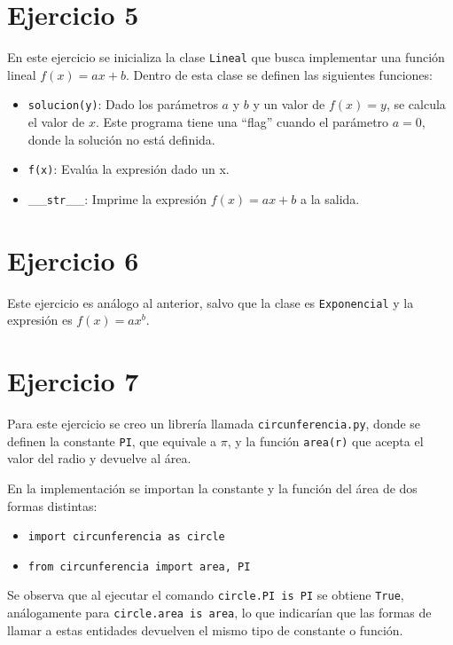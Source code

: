 \section*{Ejercicio 5}

En este ejercicio se inicializa la clase \verb|Lineal| que busca implementar una función lineal $f(x) = ax+b$. Dentro de esta clase se definen las siguientes funciones:
\begin{itemize}
	\item \verb|solucion(y)|:
		Dado los parámetros $a$ y $b$ y un valor de $f(x)=y$, se calcula el valor de $x$. Este programa tiene una ``flag'' cuando el parámetro $a=0$, donde la solución no está definida.

	\item \verb|f(x)|:		Evalúa la expresión dado un x.

	\item \_\_\verb|str|\_\_: 		Imprime la expresión $f(x) = ax+b$ a la salida.
\end{itemize}

\section*{Ejercicio 6}

Este ejercicio es análogo al anterior, salvo que la clase es \verb|Exponencial| y la expresión es $f(x)=ax^b$.


\section*{Ejercicio 7}

Para este ejercicio se creo un librería llamada \verb|circunferencia.py|, donde se definen la constante \verb|PI|, que equivale a $\pi$, y la función \verb|area(r)| que acepta el valor del radio y devuelve al área.

En la implementación se importan la constante y la función del área de dos formas distintas: 
\begin{itemize}
	\item \verb|import circunferencia as circle|
	\item \verb|from circunferencia import area, PI|
\end{itemize}
Se observa que al  ejecutar el comando \verb|circle.PI is PI| se obtiene \verb|True|, análogamente para \verb|circle.area is area|, lo que indicarían que las formas de llamar a estas entidades devuelven el mismo tipo de constante o función.


